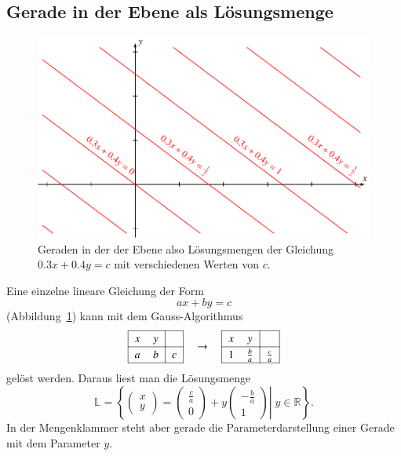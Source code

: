 %
%
%
\subsection{Gerade in der Ebene als Lösungsmenge}
\begin{figure}
\centering
\includegraphics{3/images/geradeloesung.pdf}
\caption{Geraden in der der Ebene also Lösungsmengen der Gleichung
$0.3x+0.4y=c$ mit verschiedenen Werten von $c$.
\label{skript:affin:geradeloesung}}
\end{figure}
Eine einzelne lineare Gleichung der Form 
\[
ax+by=c
\]
(Abbildung~\ref{skript:affin:geradeloesung})
kann mit dem Gauss-Algorithmus
\[
\begin{tabular}{|>{$}c<{$} >{$}c<{$}|>{$}c<{$}|}
\hline
x&y&\\
\hline
a&b&c\\
\hline
\end{tabular}
\quad\rightarrow\quad
{
\def\arraystretch{1.2}
\begin{tabular}{|>{$}c<{$} >{$}c<{$}|>{$}c<{$}|}
\hline
x&y&\\
\hline
1&\frac{b}{a}&\frac{c}{a}\\
\hline
\end{tabular}
}
\]
gelöst werden.
Daraus liest man die Lösungsmenge
\[
\mathbb L
=
\left\{
\left.
\begin{pmatrix} x\\ y \end{pmatrix}
=
\begin{pmatrix} \frac{c}{a}\\0 \end{pmatrix}
+
y\begin{pmatrix} -\frac{b}{a} \\ 1 \end{pmatrix}
\right|
\;
y\in\mathbb R
\right\}.
\]
In der Mengenklammer steht aber gerade die Parameterdarstellung
einer Gerade mit dem Parameter $y$.

